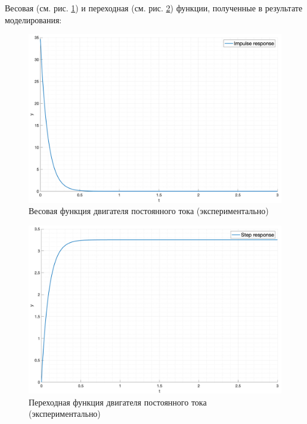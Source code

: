 Весовая (см. рис. \ref{fig:task1_impulse_response_exp}) и переходная (см. рис. \ref{fig:task1_step_response_exp}) функции, полученные в результате моделирования: 
\begin{figure}[ht!]
    \centering
    \includegraphics[width=\textwidth]{media/plots/task1_impulse_response_exp.png}
    \caption{Весовая функция двигателя постоянного тока (экспериментально)}
    \label{fig:task1_impulse_response_exp}
\end{figure}
\begin{figure}[ht!]
    \centering
    \includegraphics[width=\textwidth]{media/plots/task1_step_response_exp.png}
    \caption{Переходная функция двигателя постоянного тока (экспериментально)}
    \label{fig:task1_step_response_exp}
\end{figure}

